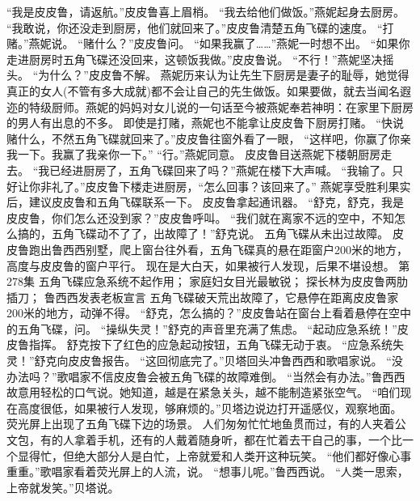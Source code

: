 \documentclass[a4paper,12pt,UTF8,twoside]{ctexbook}
\begin{document}
        “我是皮皮鲁，请返航。”皮皮鲁喜上眉梢。  
        “我去给他们做饭。”燕妮起身去厨房。  
        “我敢说，你还没走到厨房，他们就回来了。”皮皮鲁清楚五角飞碟的速度。  
        “打赌。”燕妮说。  
        “赌什么？”皮皮鲁问。  
        “如果我赢了……”燕妮一时想不出。  
        “如果你走进厨房时五角飞碟还没回来，这顿饭我做。”皮皮鲁说。  
        “不行！”燕妮坚决摇头。  
        “为什么？”皮皮鲁不解。  
        燕妮历来认为让先生下厨房是妻子的耻辱，她觉得真正的女人(不管有多大成就)都不会让自己的先生做饭。如果要做，就去当闻名遐迩的特级厨师。燕妮的妈妈对女儿说的一句话至今被燕妮奉若神明：在家里下厨房的男人有出息的不多。  
        即使是打赌，燕妮也不能拿让皮皮鲁下厨房打赌。  
        “快说赌什么，不然五角飞碟就回来了。”皮皮鲁往窗外看了一眼，  “这样吧，你赢了你亲我一下。我赢了我亲你一下。”  
        “行。”燕妮同意。  
        皮皮鲁目送燕妮下楼朝厨房走去。  
        “我已经进厨房了，五角飞碟回来了吗？”燕妮在楼下大声喊。  
        “我输了。只好让你非礼了。”皮皮鲁下楼走进厨房，“怎么回事？该回来了。”  
        燕妮享受胜利果实后，建议皮皮鲁和五角飞碟联系一下。  
        皮皮鲁拿起通讯器。  
        “舒克，舒克，我是皮皮鲁，你们怎么还没到家？”皮皮鲁呼叫。  
        “我们就在离家不远的空中，不知怎么搞的，五角飞碟动不了了，出故障了！”舒克说。  
        五角飞碟从未出过故障。  
        皮皮鲁跑出鲁西西别墅，爬上窗台往外看，五角飞碟真的悬在距窗户200米的地方，高度与皮皮鲁的窗户平行。  
        现在是大白天，如果被行人发现，后果不堪设想。          第278集  
        五角飞碟应急系统不起作用；  
        家庭妇女目光最敏锐；  
        探长林为皮皮鲁两肋插刀；  
        鲁西西发表老板宣言    
        五角飞碟破天荒出故障了，它悬停在距离皮皮鲁家200米的地方，动弹不得。  
        “舒克，怎么搞的？”皮皮鲁站在窗台上看着悬停在空中的五角飞碟，问。  
        “操纵失灵！”舒克的声音里充满了焦虑。  
        “起动应急系统！”皮皮鲁指挥。  
        舒克按下了红色的应急起动按钮，五角飞碟无动于衷。  
        “应急系统失灵！”舒克向皮皮鲁报告。  
        “这回彻底完了。”贝塔回头冲鲁西西和歌唱家说。        
        “没办法吗？”歌唱家不信皮皮鲁会被五角飞碟的故障难倒。  
        “当然会有办法。”鲁西西故意用轻松的口气说。她知道，越是在紧急关头，越不能制造紧张空气。  
        “咱们现在高度很低，如果被行人发现，够麻烦的。”贝塔边说边打开遥感仪，观察地面。  
        荧光屏上出现了五角飞碟下边的场景。  
        人们匆匆忙忙地鱼贯而过，有的人夹着公文包，有的人拿着手机，还有的人戴着随身听，都在忙着去干自己的事，一个比一个显得忙，但绝大部分人是白忙，上帝就爱和人类开这种玩笑。  
        “他们都好像心事重重。”歌唱家看着荧光屏上的人流，说。  
        “想事儿呢。”鲁西西说。  
        “人类一思索，上帝就发笑。”贝塔说。  
\end{document}
